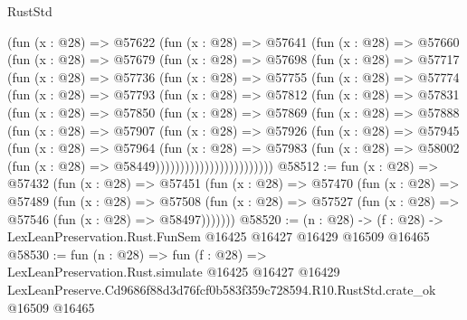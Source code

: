 \begin{lexlean}{RustStd}
\begin{coremodule}
        (fun (x : @28) =>
        @57622
          (fun (x : @28) =>
          @57641
            (fun (x : @28) =>
            @57660
              (fun (x : @28) =>
              @57679
                (fun (x : @28) =>
                @57698
                  (fun (x : @28) =>
                  @57717
                    (fun (x : @28) =>
                    @57736
                      (fun (x : @28) =>
                      @57755
                        (fun (x : @28) =>
                        @57774
                          (fun (x : @28) =>
                          @57793
                            (fun (x : @28) =>
                            @57812
                              (fun (x : @28) =>
                              @57831
                                (fun (x : @28) =>
                                @57850
                                  (fun (x : @28) =>
                                  @57869
                                    (fun (x : @28) =>
                                    @57888
                                      (fun (x : @28) =>
                                      @57907
                                        (fun (x : @28) =>
                                        @57926
                                          (fun (x : @28) =>
                                          @57945
                                            (fun (x : @28) =>
                                            @57964
                                              (fun (x : @28) =>
                                              @57983
                                                (fun (x : @28) =>
                                                @58002
                                                  (fun (x : @28) => @58449))))))))))))))))))))))))
@58512 := fun (x : @28) =>
  @57432
    (fun (x : @28) =>
    @57451
      (fun (x : @28) =>
      @57470
        (fun (x : @28) =>
        @57489
          (fun (x : @28) =>
          @57508 (fun (x : @28) => @57527 (fun (x : @28) => @57546 (fun (x : @28) => @58497)))))))
@58520 := (n : @28) ->
  (f : @28) -> LexLeanPreservation.Rust.FunSem @16425 @16427 @16429 @16509 @16465
@58530 := fun (n : @28) =>
  fun (f : @28) =>
  LexLeanPreservation.Rust.simulate
    @16425
    @16427
    @16429
    LexLeanPreserve.Cd9686f88d3d76fcf0b583f359c728594.R10.RustStd.crate_ok
    @16509
    @16465
\end{coremodule}
\end{lexlean}
